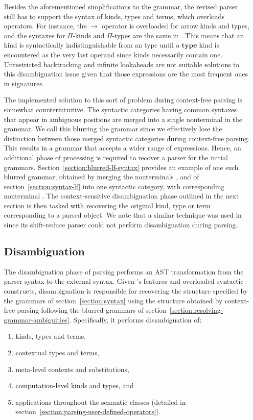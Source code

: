 \clearpage

Besides the aforementioned simplifications to the grammar, the revised parser still has to support the syntax of \LF kinds, types and terms, which overloads operators.
For instance, the $\to$ operator is overloaded for arrow kinds and types, and the syntaxes for $\Pi$-kinds and $\Pi$-types are the same in \Beluga.
This means that an \LF kind is syntactically indistinguishable from an \LF type until a $\mathbf{type}$ kind is encountered as the very last operand since \LF kinds necessarily contain one.
Unrestricted backtracking and infinite lookaheads are not suitable solutions to this disambiguation issue given that those expressions are the most frequent ones in \Beluga signatures.

The implemented solution to this sort of problem during context-free parsing is somewhat counterintuitive.
The syntactic categories having common syntaxes that appear in ambiguous positions are merged into a single nonterminal in the grammar.
We call this blurring the grammar since we effectively lose the distinction between those merged syntactic categories during context-free parsing.
This results in a grammar that accepts a wider range of expressions.
Hence, an additional phase of processing is required to recover a parser for the initial grammars.
Section~\ref{section:blurred-lf-syntax} provides an example of one such blurred grammar, obtained by merging the nonterminals ,  and  of section~\ref{section:syntax-lf} into one syntactic category, with corresponding nonterminal .
The context-sensitive disambiguation phase outlined in the next section is then tasked with recovering the original \LF kind, type or term corresponding to a parsed \LF object.
We note that a similar technique was used in \Twelf since its shift-reduce parser could not perform disambiguation during parsing.

\subsection{Disambiguation}

The disambiguation phase of parsing performs an \ac{AST} transformation from the parser syntax to the external syntax.
Given \Beluga's features and overloaded syntactic constructs, disambiguation is responsible for recovering the structure specified by the grammars of section~\ref{section:syntax} using the structure obtained by context-free parsing following the blurred grammars of section~\ref{section:resolving-grammar-ambiguities}.
Specifically, it performs disambiguation of:
\begin{enumerate}
\item \LF kinds, types and terms,
\item contextual \LF types and terms,
\item meta-level contexts and substitutions,
\item computation-level kinds and types, and
\item applications throughout the semantic classes (detailed in section~\ref{section:parsing-user-defined-operators}).
\end{enumerate}

